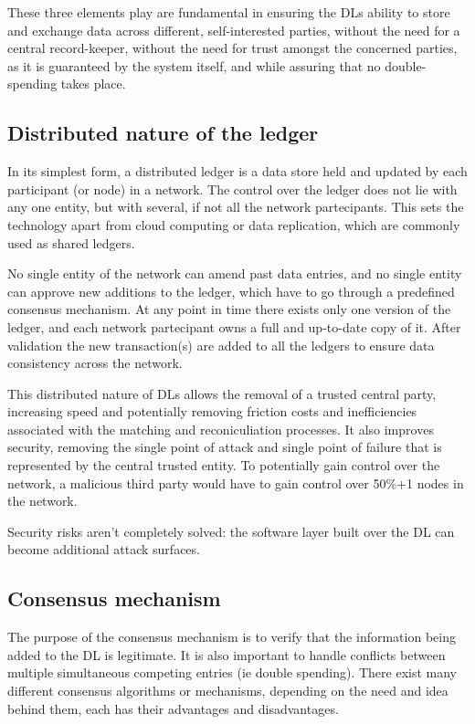 These three elements play are fundamental in ensuring the DLs ability to store and exchange data across different, self-interested parties, without the need for a central record-keeper, without the need for trust amongst the concerned parties, as it is guaranteed by the system itself, and while assuring that no double-spending takes place.

\subsection{Distributed nature of the ledger}
In its simplest form, a distributed ledger is a data store held and updated by each participant (or node) in a network. The control over the ledger does not lie with any one entity, but with several, if not all the network partecipants. This sets the technology apart from cloud computing or data replication, which are commonly used as shared ledgers.

No single entity of the network can amend past data entries, and no single entity can approve new additions to the ledger, which have to go through a predefined consensus mechanism. At any point in time there exists only one version of the ledger, and each network partecipant owns a full and up-to-date copy of it.
After validation the new transaction(s) are added to all the ledgers to ensure data consistency across the network.

This distributed nature of DLs allows the removal of a trusted central party, increasing speed and potentially removing friction costs and inefficiencies associated with the matching and reconiculiation processes. It also improves security, removing the single point of attack and single point of failure that is represented by the central trusted entity. To potentially gain control over the network, a malicious third party would have to gain control over 50\%+1 nodes in the network. 

Security risks aren't completely solved: the software layer built over the DL can become additional attack surfaces.

\subsection{Consensus mechanism}
\label{sec:consensus}
The purpose of the consensus mechanism is to verify that the information being added to the DL is legitimate. It is also important to handle conflicts between multiple simultaneous competing entries (ie double spending). There exist many different consensus algorithms or mechanisms, depending on the need and idea behind them, each has their advantages and disadvantages. \\


